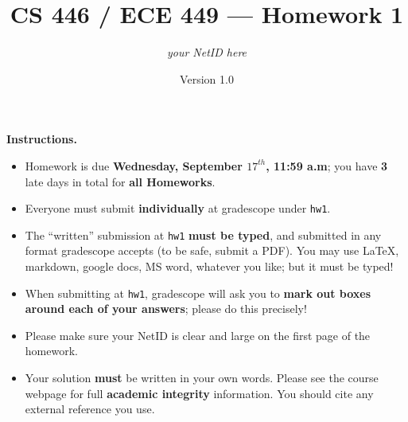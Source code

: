 \documentclass{article}
\title{CS 446 / ECE 449 --- Homework 1}
\author{\emph{your NetID here}}
\date{Version 1.0}
\theoremstyle{definition}
\theoremstyle{remark}
\begin{document}
        \maketitle

        \noindent\textbf{Instructions.}
        \begin{itemize}
          \item
            Homework is due \textbf{Wednesday, September $17^{th}$, 11:59 a.m}; you have \textbf{3} late days in total for \textbf{all Homeworks}.
        
          \item
            Everyone must submit \textbf{individually} at gradescope under \texttt{hw1}. 

        
          \item
            The ``written'' submission at \texttt{hw1} \textbf{must be typed}, and submitted in
            any format gradescope accepts (to be safe, submit a PDF).  You may use \LaTeX, markdown,
            google docs, MS word, whatever you like; but it must be typed!
        
          \item
            When submitting at \texttt{hw1}, gradescope will ask you to \textbf{mark out boxes
            around each of your answers}; please do this precisely!
        
          \item
            Please make sure your NetID is clear and large on the first page of the homework.
        
          \item
            Your solution \textbf{must} be written in your own words.
            Please see the course webpage for full \textbf{academic integrity} information.
            You should cite any external reference you use.
        

           
        \end{itemize}
\end{document}
